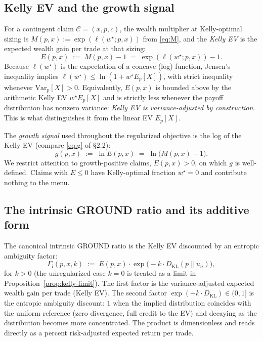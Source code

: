 \documentclass[11pt]{article}
\theoremstyle{definition}
\theoremstyle{remark}
\newcommand{\C}{\mathcal{C}}
\newcommand{\G}{g}
\newcommand{\KL}{D_{\mathrm{KL}}}
\newcommand{\GROUND}{\Gamma_{\mathrm{i}}}
\begin{document}
\subsection{Kelly EV and the growth signal}

For a contingent claim $\C = (x, p, c)$, the wealth multiplier at
Kelly-optimal sizing is $M(p, x) := \exp(\ell(w^\star; p, x))$ from
\eqref{eq:M}, and the \emph{Kelly EV} is the expected wealth gain
per trade at that sizing:
\begin{equation}
E(p, x) \;:=\; M(p, x) - 1 \;=\; \exp(\ell(w^\star; p, x)) - 1.
\label{eq:kelly-ev}
\end{equation}
Because $\ell(w^\star)$ is the expectation of a concave (log)
function, Jensen's inequality implies $\ell(w^\star) \le
\ln(1 + w^\star E_p[X])$, with strict inequality whenever
$\mathrm{Var}_p[X] > 0$. Equivalently, $E(p, x)$ is bounded above by
the arithmetic Kelly EV $w^\star E_p[X]$ and is strictly less
whenever the payoff distribution has nonzero variance: \emph{Kelly EV
is variance-adjusted by construction}. This is what distinguishes it
from the linear EV $E_p[X]$.

The \emph{growth signal} used throughout the regularized objective
is the log of the Kelly EV (compare \eqref{eq:g} of §2.2):
\begin{equation}
\G(p, x) \;:=\; \ln E(p, x) \;=\; \ln\bigl(M(p, x) - 1\bigr).
\label{eq:gdef}
\end{equation}
We restrict attention to growth-positive claims, $E(p, x) > 0$, on
which $\G$ is well-defined. Claims with $E \le 0$ have Kelly-optimal
fraction $w^\star = 0$ and contribute nothing to the menu.

\subsection{The intrinsic GROUND ratio and its additive form}

The canonical intrinsic GROUND ratio is the Kelly EV discounted by
an entropic ambiguity factor:
\begin{equation}
\GROUND(p, x, k) \;:=\; E(p, x) \cdot \exp\!\bigl(-k \cdot \KL(p \| u_n)\bigr),
\label{eq:ground}
\end{equation}
for $k > 0$ (the unregularized case $k = 0$ is treated as a limit in
Proposition~\ref{prop:kelly-limit}). The first factor is the variance-adjusted expected
wealth gain per trade (Kelly EV). The second factor $\exp(-k \cdot
\KL) \in (0, 1]$ is the entropic ambiguity discount: $1$ when the
implied distribution coincides with the uniform reference (zero
divergence, full credit to the EV) and decaying as the distribution
becomes more concentrated. The product is dimensionless and reads
directly as a percent risk-adjusted expected return per trade.
\end{document}

